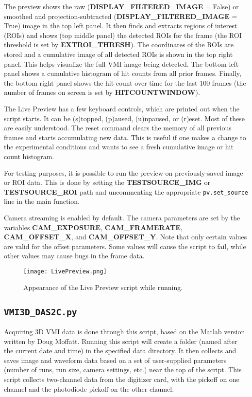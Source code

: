 \documentclass[12pt]{article}
\begin{document}
The preview shows the raw (\textbf{DISPLAY\_FILTERED\_IMAGE} = False) or smoothed and projection-subtracted (\textbf{DISPLAY\_FILTERED\_IMAGE} = True) image in the top left panel.
It then finds and extracts regions of interest (ROIs) and shows (top middle panel) the detected ROIs for the frame (the ROI threshold is set by \textbf{EXTROI\_THRESH}).
The coordinates of the ROIs are stored and a cumulative image of all detected ROIs is shown in the top right panel.
This helps visualize the full VMI image being detected.
The bottom left panel shows a cumulative histogram of hit counts from all prior frames.
Finally, the bottom right panel shows the hit count over time for the last 100 frames (the number of frames on screen is set by \textbf{HITCOUNTWINDOW}).

The Live Preview has a few keyboard controls, which are printed out when the script starts.
It can be (s)topped, (p)aused, (u)npaused, or (r)eset.
Most of these are easily understood.
The reset command clears the memory of all previous frames and starts accumulating new data.
This is useful if one makes a change to the experimental conditions and wants to see a fresh cumulative image or hit count histogram.

For testing purposes, it is possible to run the preview on previously-saved image or ROI data.
This is done by setting the \textbf{TESTSOURCE\_IMG} or \textbf{TESTSOURCE\_ROI} path and  uncommenting the appropriate \texttt{pv.set\_source} line in the main function.

Camera streaming is enabled by default.
The camera parameters are set by the variables \textbf{CAM\_EXPOSURE}, \textbf{CAM\_FRAMERATE}, \textbf{CAM\_OFFSET\_X}, and \textbf{CAM\_OFFSET\_Y}.
Note that only certain values are valid for the offset parameters.
Some values will cause the script to fail, while other values may cause bugs in the frame data.

\begin{figure}
\centering
\texttt{[image: LivePreview.png]}
\caption{
Appearance of the Live Preview script while running.
}\label{fig:LivePreview}
\end{figure}
 
\subsection{\texttt{VMI3D\_DAS2C.py}}

Acquiring 3D VMI data is done through this script, based on the Matlab version written by Doug Moffatt.
Running this script will create a folder (named after the current date and time) in the specified data directory.
It then collects and saves image and waveform data based on a set of user-supplied parameters (number of runs, run size, camera settings, etc.) near the top of the script.
This script collects two-channel data from the digitizer card, with the pickoff on one channel and the photodiode pickoff on the other channel.
\end{document}
